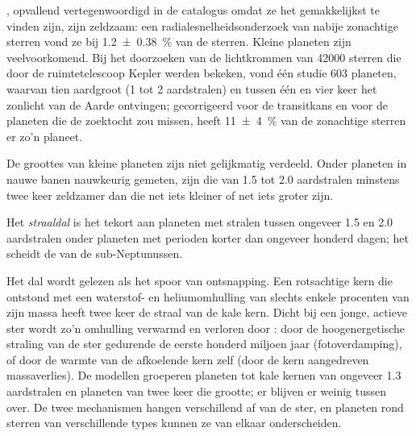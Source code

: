 , opvallend vertegenwoordigd in de catalogus omdat ze het gemakkelijkst te
vinden zijn, zijn zeldzaam: een radialesnelheidsonderzoek van nabije zonachtige sterren vond
ze bij \qty[separate-uncertainty=true]{1.2 \pm 0.38}{\percent} van de sterren. Kleine planeten zijn
veelvoorkomend. Bij het doorzoeken van de lichtkrommen van \num{42000} sterren die door de
ruimtetelescoop Kepler werden bekeken, vond één studie 603 planeten, waarvan tien aardgroot (1 tot 2
aardstralen) en tussen één en vier keer het zonlicht van de Aarde ontvingen;
gecorrigeerd voor de transitkans en voor de planeten die de
zoektocht zou missen, heeft \qty[separate-uncertainty=true]{11 \pm 4}{\percent} van de zonachtige sterren er zo'n
planeet.

De groottes van kleine planeten zijn niet gelijkmatig verdeeld. Onder planeten in nauwe banen
nauwkeurig gemeten, zijn die van 1.5 tot 2.0 aardstralen minstens
twee keer zeldzamer dan die net iets kleiner of net iets groter zijn.

\begin{definition}[Straaldal]\label{def:b3:exoplanets:radius-valley}
Het \emph{straaldal} is het tekort aan planeten
met stralen tussen ongeveer 1.5 en 2.0 aardstralen onder planeten met
perioden korter dan ongeveer honderd dagen; het scheidt de 
van de sub-Neptunussen.
\end{definition}

Het dal wordt gelezen als het spoor van ontsnapping. Een rotsachtige kern die ontstond met een
waterstof- en heliumomhulling van slechts enkele procenten van zijn massa heeft twee keer
de straal van de kale kern. Dicht bij een jonge, actieve ster wordt zo'n
omhulling verwarmd en verloren door : door de
hoogenergetische straling van de ster gedurende de eerste honderd miljoen jaar
(fotoverdamping), of door de warmte van de afkoelende kern zelf (door de kern aangedreven
massaverlies). De modellen groeperen planeten tot kale kernen van ongeveer 1.3 aardstralen
en planeten van twee keer die grootte; er blijven er weinig tussen over. De twee
mechanismen hangen verschillend af van de ster, en planeten rond sterren van
verschillende types kunnen ze van elkaar onderscheiden.

